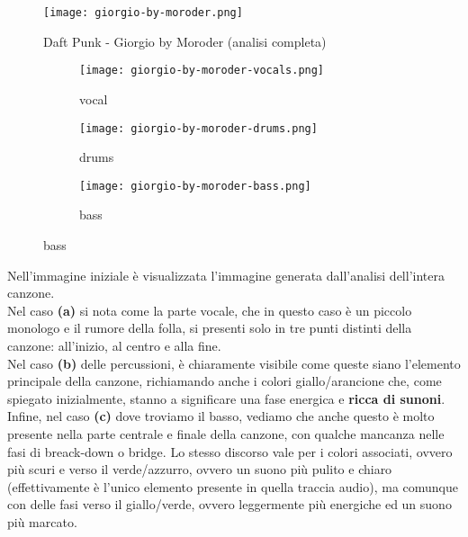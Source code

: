 \documentclass{article}
\begin{document}
\begin{figure}[h]
    \centering
    \texttt{[image: giorgio-by-moroder.png]}
    \caption{Daft Punk - Giorgio by Moroder (analisi completa)}
    \label{fig:giorgio-by-moroder-main}
\end{figure}

\begin{figure}[h]
    \centering
    \begin{subfigure}{0.3\linewidth}
        \centering
        \texttt{[image: giorgio-by-moroder-vocals.png]}
        \caption{vocal}
        \label{fig:sub1}
    \end{subfigure}%
    \begin{subfigure}{0.3\linewidth}
        \centering
        \texttt{[image: giorgio-by-moroder-drums.png]}
        \caption{drums}
        \label{fig:sub2}
    \end{subfigure}%
    \begin{subfigure}{0.3\linewidth}
        \centering
        \texttt{[image: giorgio-by-moroder-bass.png]}
        \caption{bass}
        \label{fig:sub3}
    \end{subfigure}
    \label{fig:separazione-traccie}
\end{figure}
Nell'immagine iniziale è visualizzata l'immagine generata dall'analisi dell'intera canzone.\\
Nel caso \textbf{(a)} si nota come la parte vocale, che in questo caso è un piccolo monologo e il rumore della folla, si presenti solo in tre punti distinti della canzone: all'inizio, al centro e alla fine.\\
Nel caso \textbf{(b)} delle percussioni, è chiaramente visibile come queste siano l'elemento principale della canzone, richiamando anche i colori giallo/arancione che, come spiegato inizialmente, stanno a significare una fase energica e \textbf{ricca di sunoni}.\\
Infine, nel caso \textbf{(c)} dove troviamo il basso, vediamo che anche questo è molto presente nella parte centrale e finale della canzone, con qualche mancanza nelle fasi di breack-down o bridge. Lo stesso discorso vale per i colori associati, ovvero più scuri e verso il verde/azzurro, ovvero un suono più pulito e chiaro (effettivamente è l'unico elemento presente in quella traccia audio), ma comunque con delle fasi verso il giallo/verde, ovvero leggermente più energiche ed un suono più marcato.\\
\\
\end{document}
